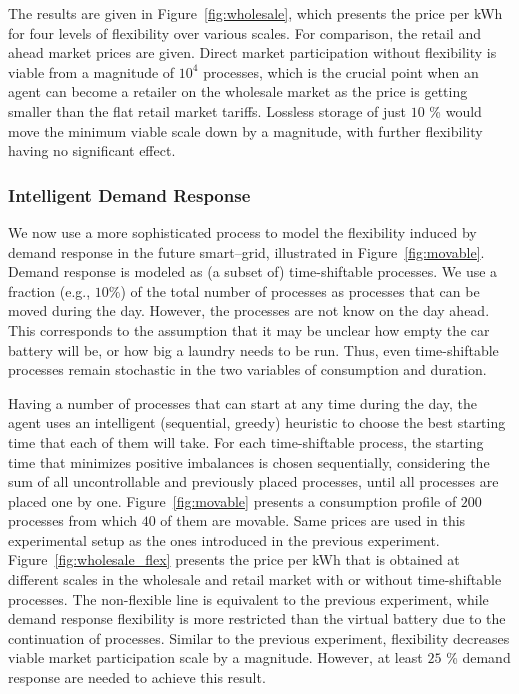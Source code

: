 \documentclass[conference]{IEEEtran}
\begin{document}
The results are given in Figure~\ref{fig:wholesale}, which presents the price per kWh for four levels of flexibility over various scales. For comparison, the retail and ahead market prices are given. Direct market participation without flexibility is viable from a magnitude of $10^4$ processes, which is the crucial point when an agent can become a retailer on the wholesale market as the price is getting smaller than the flat retail market tariffs. Lossless storage of just $10$ \% would move the minimum viable scale down by a magnitude, with further flexibility having no significant effect.

\subsubsection{Intelligent Demand Response}

We now use a more sophisticated process to model the flexibility induced by demand response in the future smart--grid, illustrated in Figure~\ref{fig:movable}. Demand response is modeled as (a subset of) time-shiftable processes. We use a fraction (e.g., $10\%$) of the total number of processes as processes that can be moved during the day. However, the processes are not know on the day ahead. This corresponds to the assumption that it may be unclear how empty the car battery will be, or how big a laundry needs to be run. Thus, even time-shiftable processes remain stochastic in the two variables of consumption and duration.

Having a number of processes that can start at any time during the day, the agent uses an intelligent (sequential, greedy) heuristic to choose the best starting time that each of them will take. For each time-shiftable process, the starting time that minimizes positive imbalances is chosen sequentially, considering the sum of all uncontrollable and previously placed processes, until all processes are placed one by one. Figure~\ref{fig:movable} presents a consumption profile of $200$ processes from which $40$ of them are movable. Same prices are used in this experimental setup as the ones introduced in the previous experiment. Figure~\ref{fig:wholesale_flex} presents the price per kWh that is obtained at different scales in the wholesale and retail market with or without time-shiftable processes. The non-flexible line is equivalent to the previous experiment, while demand response flexibility is more restricted than the virtual battery due to the continuation of processes. Similar to the previous experiment, flexibility decreases viable market participation scale by a magnitude. However, at least $25$ \% demand response are needed to achieve this result.
\end{document}
